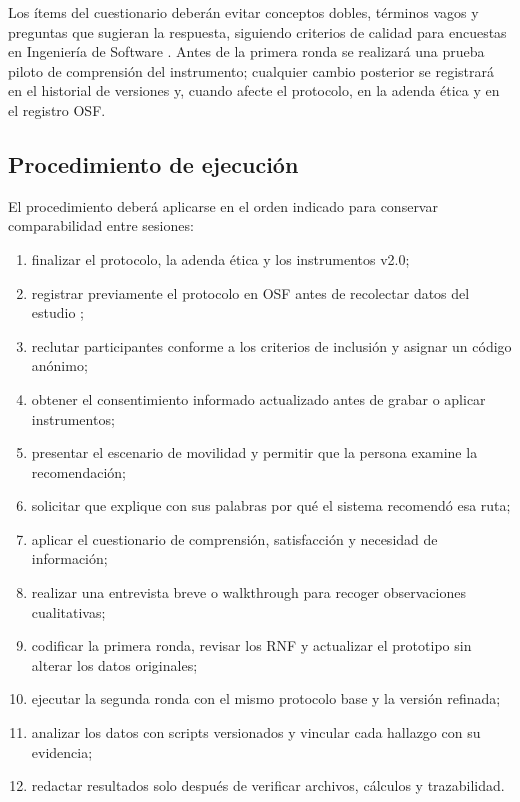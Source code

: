 \documentclass[12pt,a4paper]{article}
\begin{document}
Los ítems del cuestionario deberán evitar conceptos dobles, términos vagos y preguntas que sugieran la respuesta, siguiendo criterios de calidad para encuestas en Ingeniería de Software \cite{molleri2020}. Antes de la primera ronda se realizará una prueba piloto de comprensión del instrumento; cualquier cambio posterior se registrará en el historial de versiones y, cuando afecte el protocolo, en la adenda ética y en el registro OSF.

\subsection{Procedimiento de ejecución}

El procedimiento deberá aplicarse en el orden indicado para conservar comparabilidad entre sesiones:

\begin{enumerate}
  \item finalizar el protocolo, la adenda ética y los instrumentos v2.0;
  \item registrar previamente el protocolo en OSF antes de recolectar datos del estudio \cite{nosek2018};
  \item reclutar participantes conforme a los criterios de inclusión y asignar un código anónimo;
  \item obtener el consentimiento informado actualizado antes de grabar o aplicar instrumentos;
  \item presentar el escenario de movilidad y permitir que la persona examine la recomendación;
  \item solicitar que explique con sus palabras por qué el sistema recomendó esa ruta;
  \item aplicar el cuestionario de comprensión, satisfacción y necesidad de información;
  \item realizar una entrevista breve o walkthrough para recoger observaciones cualitativas;
  \item codificar la primera ronda, revisar los RNF y actualizar el prototipo sin alterar los datos originales;
  \item ejecutar la segunda ronda con el mismo protocolo base y la versión refinada;
  \item analizar los datos con scripts versionados y vincular cada hallazgo con su evidencia;
  \item redactar resultados solo después de verificar archivos, cálculos y trazabilidad.
\end{enumerate}
\end{document}
